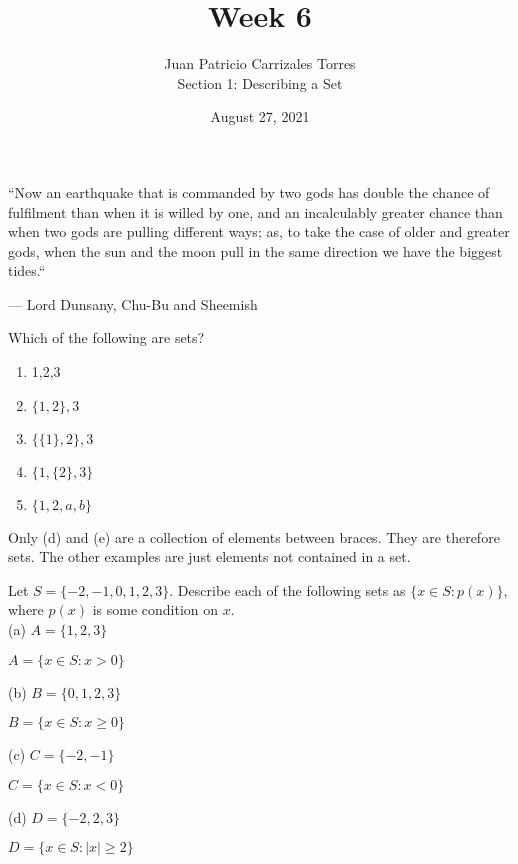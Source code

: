 \documentclass[12pt]{article}
\newenvironment{problem}[2][Problem]{\begin{trivlist}
		\item[\hskip \labelsep {\bfseries #1}\hskip \labelsep {\bfseries #2.}]}{\end{trivlist}}
\newenvironment{solution}[2][Solution]{\begin{trivlist}
		\item[\hskip \labelsep {\bfseries #1}\hskip \labelsep {\bfseries #2.}]}{\end{trivlist}}
\begin{document}
	
	\title{Week 6}
	\author{Juan Patricio Carrizales Torres \\
		Section 1: Describing a Set}
	\date{August 27, 2021}
	\maketitle
	 
	\epigraph{``Now an earthquake that is commanded by two gods has double the chance of fulfilment than when it is willed by one, and an incalculably greater chance than when two gods are pulling different ways; as, to take the case of older and greater gods, when the sun and the moon pull in the same direction we have the biggest tides.``}{--- \textup{Lord Dunsany}, Chu-Bu and Sheemish}
	
	\begin{problem}{1}
		Which of the following are sets?
		\begin{enumerate}[label=\alph*]
			\item 1,2,3
			\item $\{1,2\},3$
			\item $\{\{1\},2\},3$
			\item $\{1,\{2\},3\}$
			\item $\{1,2,a,b\}$
		\end{enumerate}
		\begin{solution}{}
		Only (d) and (e) are a collection of elements between braces. They are therefore sets. The other examples are just elements not contained in a set.
		\end{solution}
	\end{problem}

	\begin{problem}{2}
		Let $S=\{-2,-1,0,1,2,3\}$. Describe each of the following sets as $\{x\in S:p(x)\}$, where $p(x)$ is some condition on $x$.\\
		
		(a) $A=\{1,2,3\}$
		\begin{solution}{a}
			$A=\{x\in S: x>0\}$
		\end{solution}
		(b) $B=\{0,1,2,3\}$
		\begin{solution}{b}
			$B=\{x\in S: x\geq 0\}$
		\end{solution}
		(c) $C=\{-2,-1\}$
		\begin{solution}{c}
			$C=\{x\in S: x < 0\}$
		\end{solution} 
		(d) $D=\{-2,2,3\}$
		\begin{solution}{d}
			$D=\{x\in S: |x|\geq 2\}$
		\end{solution}
	\end{problem}
\end{document}
